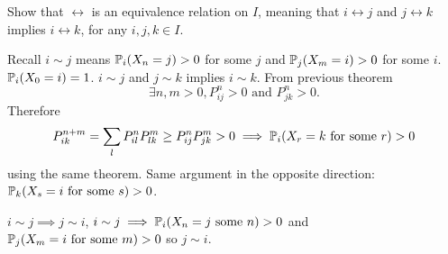 \documentclass[10pt, a4paper]{article}
\begin{document}
\begin{problem}
    Show that $\leftrightarrow$ is an equivalence relation on $I$,
    meaning that $i \leftrightarrow j$ and $j \leftrightarrow k$ implies $i \leftrightarrow k$,
    for any $i, j, k \in I$.

    \begin{solution}
        Recall $i \sim j$ means $\P_i(X_n = j) > 0$ for some $j$ and $\P_j(X_m = i) > 0$ for some $i$.
        $\P_i(X_0 = i) = 1$.
        $i \sim j$ and $j \sim k$ implies $i \sim k$.
        From previous theorem
        \[
        \exists n, m > 0, P_{ij}^{n} > 0\text{ and } P_{jk}^{n} > 0.
        \]
        Therefore
        \[
        P_{ik}^{n + m} = \sum_{l}P_{il}^{n}P_{lk}^{m} \geq P_{ij}^{n}P_{jk}^{m} > 0 \implies \P_i(X_r = k\text{ for some $r$}) > 0
        \]
        using the same theorem.
        Same argument in the opposite direction:
        $\P_k(X_s = i\text{ for some $s$}) > 0$.

        $i \sim j \implies j \sim i$,
        $i \sim j \implies \P_i(X_n = j\text{ some $n$}) > 0$ and $\P_j(X_m = i\text{ for some $m$}) > 0$ so $j \sim i$.
    \end{solution}
\end{problem}
\end{document}
